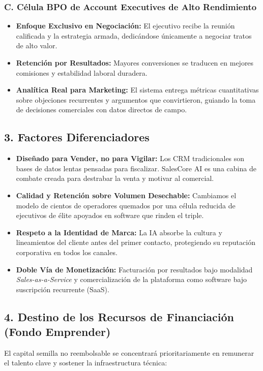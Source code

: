 \documentclass[12pt,letterpaper]{article}
\begin{document}
\subsubsection*{C. Célula BPO de Account Executives de Alto Rendimiento}
\begin{itemize}
    \item \textbf{Enfoque Exclusivo en Negociación:} El ejecutivo recibe la reunión calificada y la estrategia armada, dedicándose únicamente a negociar tratos de alto valor.
    \item \textbf{Retención por Resultados:} Mayores conversiones se traducen en mejores comisiones y estabilidad laboral duradera.
    \item \textbf{Analítica Real para Marketing:} El sistema entrega métricas cuantitativas sobre objeciones recurrentes y argumentos que convirtieron, guiando la toma de decisiones comerciales con datos directos de campo.
\end{itemize}

\subsection*{3. Factores Diferenciadores}
\begin{itemize}
    \item \textbf{Diseñado para Vender, no para Vigilar:} Los CRM tradicionales son bases de datos lentas pensadas para fiscalizar. SalesCore AI es una cabina de combate creada para destrabar la venta y motivar al comercial.
    \item \textbf{Calidad y Retención sobre Volumen Desechable:} Cambiamos el modelo de cientos de operadores quemados por una célula reducida de ejecutivos de élite apoyados en software que rinden el triple.
    \item \textbf{Respeto a la Identidad de Marca:} La IA absorbe la cultura y lineamientos del cliente antes del primer contacto, protegiendo su reputación corporativa en todos los canales.
    \item \textbf{Doble Vía de Monetización:} Facturación por resultados bajo modalidad \textit{Sales-as-a-Service} y comercialización de la plataforma como software bajo suscripción recurrente (SaaS).
\end{itemize}

\subsection*{4. Destino de los Recursos de Financiación (Fondo Emprender)}
El capital semilla no reembolsable se concentrará prioritariamente en remunerar el talento clave y sostener la infraestructura técnica:
\end{document}
